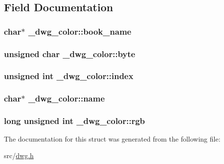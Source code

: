 \subsection{\-Field \-Documentation}
\hypertarget{struct__dwg__color_a6981dc1600f9d2d36fb9559a2c2b35a5}{
\subsubsection[{book\-\_\-name}]{\setlength{\rightskip}{0pt plus 5cm}char$\ast$ {\bf \-\_\-dwg\-\_\-color\-::book\-\_\-name}}}\label{struct__dwg__color_a6981dc1600f9d2d36fb9559a2c2b35a5}
\hypertarget{struct__dwg__color_a231f0e6ba545239464fc04d2c2dd0abb}{
\subsubsection[{byte}]{\setlength{\rightskip}{0pt plus 5cm}unsigned char {\bf \-\_\-dwg\-\_\-color\-::byte}}}\label{struct__dwg__color_a231f0e6ba545239464fc04d2c2dd0abb}
\hypertarget{struct__dwg__color_a722df537089db60c3c3217e44e290657}{
\subsubsection[{index}]{\setlength{\rightskip}{0pt plus 5cm}unsigned int {\bf \-\_\-dwg\-\_\-color\-::index}}}\label{struct__dwg__color_a722df537089db60c3c3217e44e290657}
\hypertarget{struct__dwg__color_afbeeb3b4d57fc5dfd35408c9e43d66e2}{
\subsubsection[{name}]{\setlength{\rightskip}{0pt plus 5cm}char$\ast$ {\bf \-\_\-dwg\-\_\-color\-::name}}}\label{struct__dwg__color_afbeeb3b4d57fc5dfd35408c9e43d66e2}
\hypertarget{struct__dwg__color_a629e183d759e35c8a6cf58aefc6ca4c2}{
\subsubsection[{rgb}]{\setlength{\rightskip}{0pt plus 5cm}long unsigned int {\bf \-\_\-dwg\-\_\-color\-::rgb}}}\label{struct__dwg__color_a629e183d759e35c8a6cf58aefc6ca4c2}


\-The documentation for this struct was generated from the following file\-:\begin{DoxyCompactItemize}
\item 
src/\hyperlink{dwg_8h}{dwg.\-h}\end{DoxyCompactItemize}
